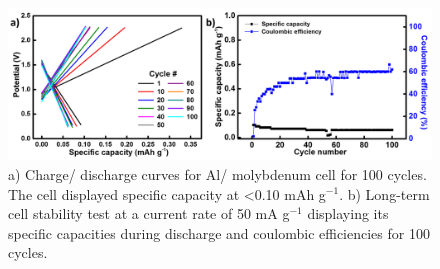 \begin{figure}[tbh!]
\centering
\includegraphics[width=\textwidth]{Figures/chap7fig/blankmo}
\caption{a) Charge/ discharge curves for Al/ molybdenum cell for 100 cycles. The cell displayed specific capacity at <0.10 mAh g$^{-1}$. b) Long-term cell stability test at a current rate of 50 mA g$^{-1}$ displaying its specific capacities during discharge and coulombic efficiencies for 100 cycles.}
\label{Figures/chap7fig:blankmo}
\end{figure}

